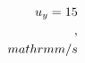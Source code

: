\documentclass[preview]{standalone}
\begin{document}
\begin{align*}
\special{dvisvgm:raw <g id='unique000'>}u_y = 15\\,\\mathrm{m/s}\special{dvisvgm:raw </g>}
\end{align*}
\end{document}

